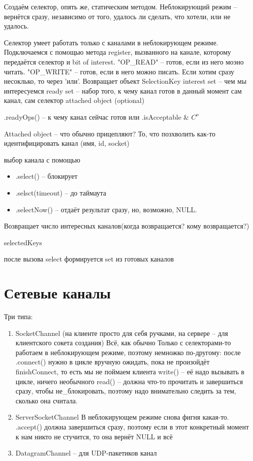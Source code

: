 Создаём селектор, опять же, статическим методом.
Неблокирующий режим -- вернётся сразу, независимо от того, удалось ли сделать, что хотели, или не удалось.

Селектор умеет работать только с каналами в неблокирующем режиме.
Подключаемся с помощью метода register, вызванного на канале, которому передаётся селектор и bit of interest.
\java"OP\_READ" -- готов, если из него моэно читать.
\java"OP\_WRITE" -- готов, если в него можно писать.
Если хотим сразу несоклько, то через 'или'.
Возвращает объект SelectionKey
interest set -- чем мы интересуемся
ready set -- набор того, к чему канал готов в данный момент
сам канал, сам селектор
attached object (optional)

.readyOps() -- к чему канал сейчас готов
или .isAcceptable \& $C^o$

Attached object -- что обычно прицепляют? То, что позхволить как-то идентифицировать канал (имя, id, socket)

выбор канала с помощью 
\begin{itemize}
	\item .select() -- блокирует
	\item .selsct(timeout) -- до таймаута
	\item .selectNow() -- отдаёт результат сразу, но, возможно, NULL.
\end{itemize}

Возвращает число интересных каналов(когда возвращается? кому возвращается?)

selectedKeys

после вызова select формируется set из готовых каналов

\section{Сетевые каналы}
Три типа:
\begin{enumerate}
\item SocketChannel (на клиенте просто для себя ручками, на сервере -- для клиентского сокета создания)
Всё, как обычно
Только с селекторами-то работаем в неблокирующем режиме, поэтому немножко по-другому: после .connect() нужно в цикле вручную ожидать, пока не произойдёт finishConnect, то есть мы не поймаем клиента
write() -- её надо вызывать в цикле, ничего необычного
read() -- должна что-то прочитать и завершиться сразу, чтобы не\_блокировать, поэтому надо внимательно следить за тем, сколько она считала.

\item ServerSocketChannel
В неблокирующем режиме снова фигня какая-то.
.accept() должна завершиться сразу, поэтому если в этот конкретный момент к нам никто не стучится, то она вернёт NULL и всё

\item DatagramChannel -- для UDP-пакетиков канал
\end{enumerate}


